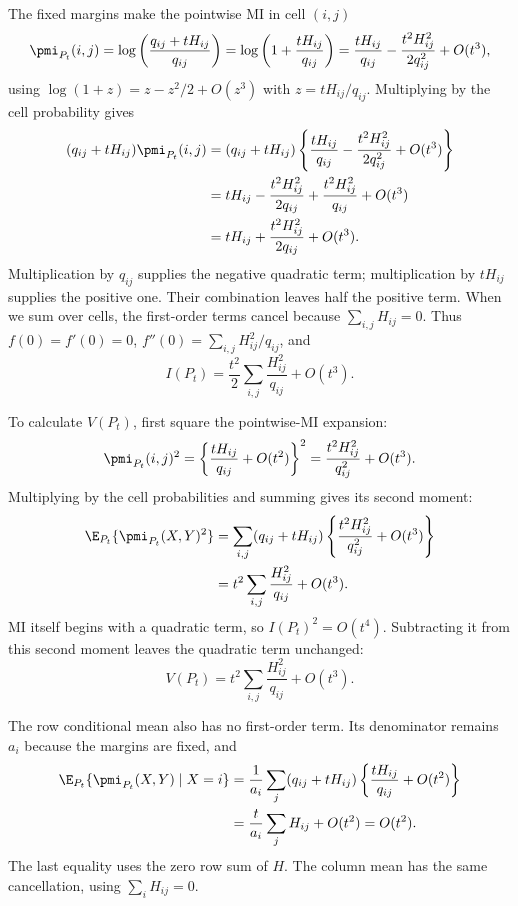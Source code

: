 The fixed margins make the pointwise MI in cell \((i,j)\)
\begin{equation}
 \pmi_{P_t}(i,j)
 =\log\left(\frac{q_{ij}+tH_{ij}}{q_{ij}}\right)
 =\log\left(1+\frac{tH_{ij}}{q_{ij}}\right)
 =\frac{tH_{ij}}{q_{ij}}-
  \frac{t^2H_{ij}^2}{2q_{ij}^2}+O(t^3),
\end{equation}
using \(\log(1+z)=z-z^2/2+O(z^3)\) with
\(z=tH_{ij}/q_{ij}\). Multiplying by the cell probability gives
\begin{align*}
 (q_{ij}+tH_{ij})\pmi_{P_t}(i,j)
 &=(q_{ij}+tH_{ij})
   \left\{\frac{tH_{ij}}{q_{ij}}
    -\frac{t^2H_{ij}^2}{2q_{ij}^2}+O(t^3)\right\}\\*
 &=tH_{ij}-\frac{t^2H_{ij}^2}{2q_{ij}}
   +\frac{t^2H_{ij}^2}{q_{ij}}+O(t^3)\\*
 &=tH_{ij}+\frac{t^2H_{ij}^2}{2q_{ij}}+O(t^3).
\end{align*}
Multiplication by \(q_{ij}\) supplies the negative quadratic term;
multiplication by \(tH_{ij}\) supplies the positive one. Their combination
leaves half the positive term. When we sum over cells, the first-order
terms cancel because \(\sum_{i,j}H_{ij}=0\).
Thus \(f(0)=f'(0)=0\), \(f''(0)=\sum_{i,j}H_{ij}^2/q_{ij}\), and
\begin{equation}
 I(P_t)=\frac{t^2}{2}\sum_{i,j}\frac{H_{ij}^2}{q_{ij}}+O(t^3).
\end{equation}

To calculate \(V(P_t)\), first square the pointwise-MI expansion:
\begin{equation*}
 \pmi_{P_t}(i,j)^2
 =\left\{\frac{tH_{ij}}{q_{ij}}+O(t^2)\right\}^2
 =\frac{t^2H_{ij}^2}{q_{ij}^2}+O(t^3).
\end{equation*}
Multiplying by the cell probabilities and summing gives its second moment:
\begin{align*}
 \E_{P_t}\{\pmi_{P_t}(X,Y)^2\}
 &=\sum_{i,j}(q_{ij}+tH_{ij})
    \left\{\frac{t^2H_{ij}^2}{q_{ij}^2}+O(t^3)\right\}\\*
 &=t^2\sum_{i,j}\frac{H_{ij}^2}{q_{ij}}+O(t^3).
\end{align*}
MI itself begins with a quadratic term, so \(I(P_t)^2=O(t^4)\).
Subtracting it from this second moment leaves the quadratic term unchanged:
\begin{equation}
 V(P_t)=t^2\sum_{i,j}\frac{H_{ij}^2}{q_{ij}}+O(t^3).
\end{equation}

The row conditional mean also has no first-order term. Its denominator
remains \(a_i\) because the margins are fixed, and
\begin{align*}
 \E_{P_t}\{\pmi_{P_t}(X,Y)\mid X=i\}
 &=\frac{1}{a_i}\sum_j(q_{ij}+tH_{ij})
   \left\{\frac{tH_{ij}}{q_{ij}}+O(t^2)\right\}\\*
 &=\frac{t}{a_i}\sum_jH_{ij}+O(t^2)
 =O(t^2).
\end{align*}
The last equality uses the zero row sum of \(H\). The column mean has the
same cancellation, using \(\sum_iH_{ij}=0\).

